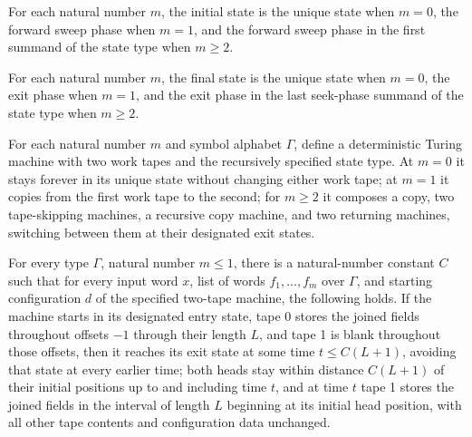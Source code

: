 \begin{definition}
\label{Turing.rt_copyEntry}
\leanok
{}
For each natural number $m$, the initial state is the unique state when $m=0$, the
forward sweep phase when $m=1$, and the forward sweep phase in the first summand of the
state type when $m\ge 2$.
\end{definition}

\begin{definition}
\label{Turing.rt_copyExit}
\leanok
{}
For each natural number $m$, the final state is the unique state when $m=0$, the exit
phase when $m=1$, and the exit phase in the last seek-phase summand of the state type
when $m\ge 2$.
\end{definition}

\begin{definition}
\label{Turing.rt_copyMachine}
\leanok
{}
For each natural number $m$ and symbol alphabet $\Gamma$, define a deterministic Turing
machine with two work tapes and the recursively specified state type. At $m=0$ it stays
forever in its unique state without changing either work tape; at $m=1$ it copies from
the first work tape to the second; for $m\ge 2$ it composes a copy, two tape-skipping
machines, a recursive copy machine, and two returning machines, switching between them
at their designated exit states.
\end{definition}

\begin{theorem}
\label{Turing.rt_copy_run_base}
\leanok
{}
For every type $\Gamma$, natural number $m\le 1$, there is a natural-number constant $C$
such that for every input word $x$, list of words $f_1,\ldots,f_m$ over $\Gamma$, and
starting configuration $d$ of the specified two-tape machine, the following holds. If
the machine starts in its designated entry state, tape 0 stores the joined fields
throughout offsets $-1$ through their length $L$, and tape 1 is blank throughout those
offsets, then it reaches its exit state at some time $t\le C(L+1)$, avoiding that state
at every earlier time; both heads stay within distance $C(L+1)$ of their initial
positions up to and including time $t$, and at time $t$ tape 1 stores the joined fields
in the interval of length $L$ beginning at its initial head position, with all other
tape contents and configuration data unchanged.
\end{theorem}

